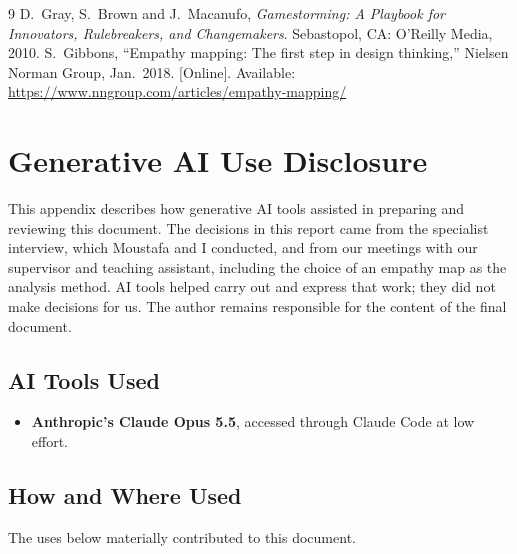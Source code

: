 \documentclass{article}
\begin{document}
\begin{thebibliography}{9}
 D.~Gray, S.~Brown and J.~Macanufo,
  \emph{Gamestorming: A Playbook for Innovators, Rulebreakers, and
  Changemakers}. Sebastopol, CA: O'Reilly Media, 2010.
 S.~Gibbons, ``Empathy mapping: The first step in
  design thinking,'' Nielsen Norman Group, Jan.~2018. [Online]. Available:
  \url{https://www.nngroup.com/articles/empathy-mapping/}
\end{thebibliography}

\newpage
\appendix

\section{Generative AI Use Disclosure}
\label{app:ai-use}

This appendix describes how generative AI tools assisted in preparing and
reviewing this document. The decisions in this report came from the specialist
interview, which Moustafa and I conducted, and from our meetings with our
supervisor and teaching assistant, including the choice of an empathy map as
the analysis method. AI tools helped carry out and express that work; they did
not make decisions for us. The author remains responsible for the content of
the final document.

\subsection{AI Tools Used}

\begin{itemize}
  \item \textbf{Anthropic's Claude Opus 5.5}, accessed through Claude Code at
  low effort.
\end{itemize}

\subsection{How and Where Used}

The uses below materially contributed to this document.
\end{document}
